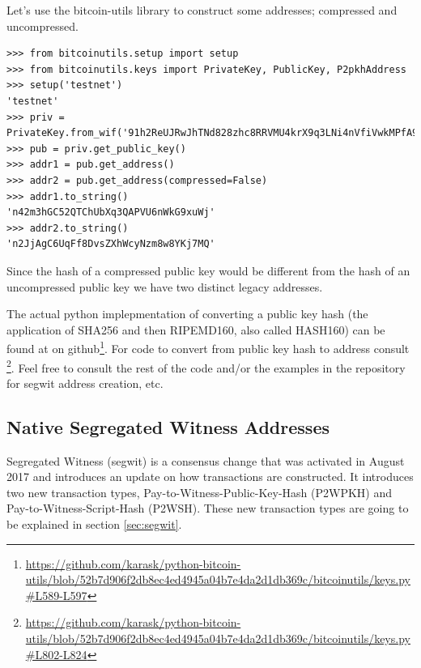Let's use the bitcoin-utils library to construct some addresses; compressed and uncompressed.

\vspace{1em}
\begin{lstlisting}[style=Python,label={lst:display-addresses},caption={Example of displaying the addresses of compressed and uncompressed public keys using Python},captionpos=b]
>>> from bitcoinutils.setup import setup
>>> from bitcoinutils.keys import PrivateKey, PublicKey, P2pkhAddress
>>> setup('testnet')
'testnet' 
>>> priv = PrivateKey.from_wif('91h2ReUJRwJhTNd828zhc8RRVMU4krX9q3LNi4nVfiVwkMPfA9p')
>>> pub = priv.get_public_key()  
>>> addr1 = pub.get_address()
>>> addr2 = pub.get_address(compressed=False)
>>> addr1.to_string()
'n42m3hGC52QTChUbXq3QAPVU6nWkG9xuWj' 
>>> addr2.to_string() 
'n2JjAgC6UqFf8DvsZXhWcyNzm8w8YKj7MQ'
\end{lstlisting}
\vspace{1em}

\begin{note}
Since the hash of a compressed public key would be different from the hash of an uncompressed public key we have two distinct legacy addresses.
\end{note}

The actual python implepmentation of converting a public key hash (the application of SHA256 and then RIPEMD160, also called HASH160) can be found at  on github\footnote{\url{https://github.com/karask/python-bitcoin-utils/blob/52b7d906f2db8ec4ed4945a04b7e4da2d1db369c/bitcoinutils/keys.py\#L589-L597}}. For code to convert from public key hash to address consult \footnote{\url{https://github.com/karask/python-bitcoin-utils/blob/52b7d906f2db8ec4ed4945a04b7e4da2d1db369c/bitcoinutils/keys.py\#L802-L824}}. Feel free to consult the rest of the code and/or the examples in the repository for segwit address creation, etc.


\subsection*{Native Segregated Witness Addresses}

Segregated Witness (segwit) is a consensus change that was activated in August 2017 and introduces an update on how transactions are constructed. It introduces two new transaction types, Pay-to-Witness-Public-Key-Hash (P2WPKH) and Pay-to-Witness-Script-Hash (P2WSH). These new transaction types are going to be explained in section \ref{sec:segwit}.

